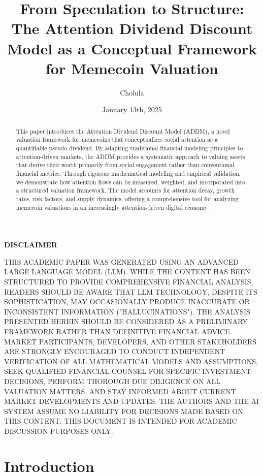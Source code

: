 \documentclass[a4paper,12pt]{article}
\title{From Speculation to Structure: The Attention Dividend Discount Model as a Conceptual Framework for Memecoin Valuation}
\author{Cholula}
\date{January 13th, 2025}
\begin{document}
\maketitle

\begin{abstract}
This paper introduces the Attention Dividend Discount Model (ADDM), a novel valuation framework for memecoins that conceptualizes social attention as a quantifiable pseudo-dividend. By adapting traditional financial modeling principles to attention-driven markets, the ADDM provides a systematic approach to valuing assets that derive their worth primarily from social engagement rather than conventional financial metrics. Through rigorous mathematical modeling and empirical validation, we demonstrate how attention flows can be measured, weighted, and incorporated into a structured valuation framework. The model accounts for attention decay, growth rates, risk factors, and supply dynamics, offering a comprehensive tool for analyzing memecoin valuations in an increasingly attention-driven digital economy.
\end{abstract}

\begin{center}
\begin{minipage}{0.9\textwidth}
\small
\begin{center}
\textbf{DISCLAIMER}
\end{center}
THIS ACADEMIC PAPER WAS GENERATED USING AN ADVANCED LARGE LANGUAGE MODEL (LLM). WHILE THE CONTENT HAS BEEN STRUCTURED TO PROVIDE COMPREHENSIVE FINANCIAL ANALYSIS, READERS SHOULD BE AWARE THAT LLM TECHNOLOGY, DESPITE ITS SOPHISTICATION, MAY OCCASIONALLY PRODUCE INACCURATE OR INCONSISTENT INFORMATION ("HALLUCINATIONS"). THE ANALYSIS PRESENTED HEREIN SHOULD BE CONSIDERED AS A PRELIMINARY FRAMEWORK RATHER THAN DEFINITIVE FINANCIAL ADVICE. MARKET PARTICIPANTS, DEVELOPERS, AND OTHER STAKEHOLDERS ARE STRONGLY ENCOURAGED TO CONDUCT INDEPENDENT VERIFICATION OF ALL MATHEMATICAL MODELS AND ASSUMPTIONS, SEEK QUALIFIED FINANCIAL COUNSEL FOR SPECIFIC INVESTMENT DECISIONS, PERFORM THOROUGH DUE DILIGENCE ON ALL VALUATION MATTERS, AND STAY INFORMED ABOUT CURRENT MARKET DEVELOPMENTS AND UPDATES. THE AUTHORS AND THE AI SYSTEM ASSUME NO LIABILITY FOR DECISIONS MADE BASED ON THIS CONTENT. THIS DOCUMENT IS INTENDED FOR ACADEMIC DISCUSSION PURPOSES ONLY.
\end{minipage}
\end{center}

\section*{Introduction}
\end{document}
